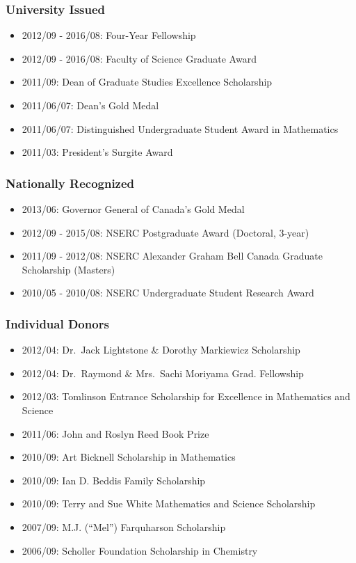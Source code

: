\documentclass[]{article}
\providecommand{\tightlist}{%
  \setlength{\itemsep}{0pt}\setlength{\parskip}{0pt}}
\begin{document}
\hypertarget{university-issued}{%
\subsubsection{University Issued}\label{university-issued}}

\begin{itemize}
\tightlist
\item
  2012/09 - 2016/08: Four-Year Fellowship
\item
  2012/09 - 2016/08: Faculty of Science Graduate Award
\item
  2011/09: Dean of Graduate Studies Excellence Scholarship
\item
  2011/06/07: Dean's Gold Medal
\item
  2011/06/07: Distinguished Undergraduate Student Award in Mathematics
\item
  2011/03: President's Surgite Award
\end{itemize}

\hypertarget{nationally-recognized}{%
\subsubsection{Nationally Recognized}\label{nationally-recognized}}

\begin{itemize}
\tightlist
\item
  2013/06: Governor General of Canada's Gold Medal
\item
  2012/09 - 2015/08: NSERC Postgraduate Award (Doctoral, 3-year)
\item
  2011/09 - 2012/08: NSERC Alexander Graham Bell Canada Graduate Scholarship (Masters)
\item
  2010/05 - 2010/08: NSERC Undergraduate Student Research Award
\end{itemize}

\hypertarget{individual-donors}{%
\subsubsection{Individual Donors}\label{individual-donors}}

\begin{itemize}
\tightlist
\item
  2012/04: Dr.~Jack Lightstone \& Dorothy Markiewicz Scholarship
\item
  2012/04: Dr.~Raymond \& Mrs.~Sachi Moriyama Grad. Fellowship
\item
  2012/03: Tomlinson Entrance Scholarship for Excellence in Mathematics and Science
\item
  2011/06: John and Roslyn Reed Book Prize
\item
  2010/09: Art Bicknell Scholarship in Mathematics
\item
  2010/09: Ian D. Beddis Family Scholarship
\item
  2010/09: Terry and Sue White Mathematics and Science Scholarship
\item
  2007/09: M.J. (``Mel'') Farquharson Scholarship
\item
  2006/09: Scholler Foundation Scholarship in Chemistry
\end{itemize}
\end{document}
